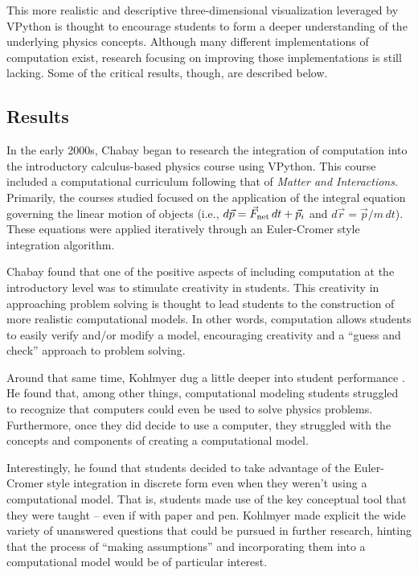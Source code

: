 \documentclass{msuphddissertation}
\begin{document}
\begin{doublespace}
This more realistic and descriptive three-dimensional visualization leveraged by VPython is thought to encourage students to form a deeper understanding of the underlying physics concepts.  Although many different implementations of computation exist, research focusing on improving those implementations is still lacking.  Some of the critical results, though, are described below.

\subsection{Results}

In the early 2000s, Chabay began to research the integration of computation into the introductory calculus-based physics course \cite{Chabay2008} using VPython.  This course included a computational curriculum following that of \textit{Matter and Interactions}.  Primarily, the courses studied focused on the application of the integral equation governing the linear motion of objects (i.e., $d\vec{p}=\vec{F}_{\rm net}\,dt+\vec{p}_{i}$ and $d\vec{r}=\vec{p}/m\,dt$).  These equations were applied iteratively through an Euler-Cromer style integration algorithm.

Chabay found that one of the positive aspects of including computation at the introductory level was to stimulate creativity in students.  This creativity in approaching problem solving is thought to lead students to the construction of more realistic computational models.  In other words, computation allows students to easily verify and/or modify a model, encouraging creativity and a ``guess and check'' approach to problem solving.

Around that same time, Kohlmyer dug a little deeper into student performance \cite{Kohlmyer2005}.  He found that, among other things, computational modeling students struggled to recognize that computers could even be used to solve physics problems.  Furthermore, once they did decide to use a computer, they struggled with the concepts and components of creating a computational model.

Interestingly, he found that students decided to take advantage of the Euler-Cromer style integration in discrete form even when they weren't using a computational model.  That is, students made use of the key conceptual tool that they were taught -- even if with paper and pen.  Kohlmyer made explicit the wide variety of unanswered questions that could be pursued in further research, hinting that the process of ``making assumptions'' and incorporating them into a computational model would be of particular interest.


\end{doublespace}
\end{document}
